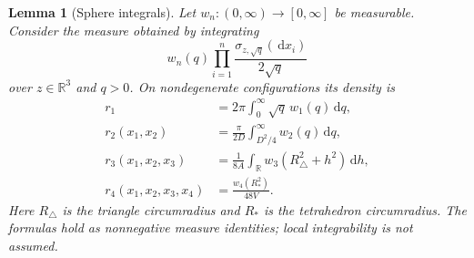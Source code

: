 \documentclass[11pt,a4paper]{article}
\numberwithin{equation}{section}
\newtheorem{lemma}[theorem]{Lemma}
\theoremstyle{definition}
\theoremstyle{remark}
\newcommand{\R}{\mathbb R}
\newcommand{\dd}{\,\mathrm d}
\begin{document}
\begin{lemma}[Sphere integrals]\label{lem:sphere-integrals}
Let $w_n:(0,\infty)\to[0,\infty]$ be measurable. Consider the measure
obtained by integrating
\[
 w_n(q)\prod_{i=1}^n\frac{\sigma_{z,\sqrt q}(\dd x_i)}{2\sqrt q}
\]
over $z\in\R^3$ and $q>0$. On nondegenerate configurations its density is
\begin{align}
 r_1&=2\pi\int_0^\infty\sqrt q\,w_1(q)\dd q,\label{eq:sphere-lemma1}\\
 r_2(x_1,x_2)&=\frac{\pi}{2D}
                 \int_{D^2/4}^\infty w_2(q)\dd q,\label{eq:sphere-lemma2}\\
 r_3(x_1,x_2,x_3)&=\frac1{8A}
                 \int_{\R}w_3(R_\triangle^2+h^2)\dd h,\label{eq:sphere-lemma3}\\
 r_4(x_1,x_2,x_3,x_4)&=\frac{w_4(R_*^2)}{48V}.\label{eq:sphere-lemma4}
\end{align}
Here $R_\triangle$ is the triangle circumradius and $R_*$ is the
tetrahedron circumradius. The formulas hold as nonnegative measure
identities; local integrability is not assumed.
\end{lemma}
\end{document}
